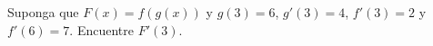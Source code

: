 \item Suponga que $F(x) = f(g(x))$ y $g(3) = 6$, $g'(3) = 4$, $f'(3) = 2$ y $f'(6) = 7$. Encuentre $F'(3)$.
